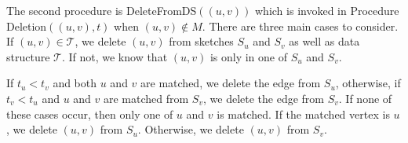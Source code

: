 \documentclass[11pt,letter]{article}
\begin{document}
The second procedure is {\sf DeleteFromDS$((u,v))$}
which is invoked in Procedure {\sf Deletion$((u,v), t)$} when $(u,v)\notin M$.
There are three main cases to consider.
If $(u,v)\in\mathcal{T}$,
we delete $(u,v)$ from sketches $S_u$ and $S_v$
as well as data structure $\mathcal{T}$.
If not, we know that $(u,v)$  is only in one of $S_u$ and $S_v$.

If $t_u<t_v$ and both $u$  and $v$ are matched, we delete the edge from $S_u$,
otherwise, if $t_v<t_u$ and $u$ and $v$ are matched from $S_v$, we delete the edge from $S_v$.
If none of these cases occur, then only one of $u$ and $v$ is matched.
If the matched vertex is $u$, we delete $(u,v)$ from $S_u$.
Otherwise, we delete $(u,v)$ from $S_v$.



\begin{center}
\end{center}





\begin{center}
\end{center}
\end{document}
